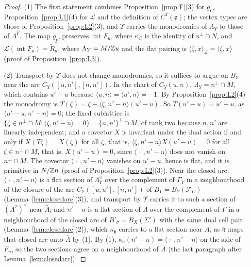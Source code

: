 \begin{proof}
(1) The first statement combines Proposition~\ref{prop:F}(3) for $g_C$, Proposition~\ref{prop:L1}(4) for $\mathcal L$ and
the definition of $C^\Upsilon({\mathfrak p})$; the vertex types are those of Proposition~\ref{prop:L2}(3), and $\Upsilon$ carries the
monodromies of $\Lambda_Y$ to those of $\Lambda^\Upsilon$. The map $g_C$ preserves $\operatorname{int}F_u$, where
$\kappa_C$ is the identity of $u^\perp\cap N$, and $\mathcal L(\operatorname{int}F_u)=\widetilde R^*_u$, where
$\Lambda_Y=M/\mathbb Z u$ and the flat pairing is $\langle\bar\zeta,x\rangle_{\mathcal L}=\langle\zeta,x\rangle$ (proof of Proposition~\ref{prop:L3}).

(2) Transport by $\Upsilon$ does not change monodromies, so it suffices to argue on $B_Y$ near the arc $C_Y([u,u'],[n,n'])$.
In the chart of $C_Y(u,n)$, $\Lambda_Y=n^\perp\cap M$, which contains $u'-u$ because $\langle u,n\rangle=\langle
u',n\rangle=-1$. By Proposition~\ref{prop:L2}(4) the monodromy is $T(\zeta)=\zeta+\langle\zeta,n'-n\rangle(u'-u)$. So
$T(u'-u)=u'-u$, as $\langle u'-u,n'-n\rangle=0$; the fixed sublattice is $\{\zeta\in n^\perp\cap M:\langle
\zeta,n'-n\rangle=0\}=\{n,n'\}^\perp\cap M$, of rank two because $n,n'$ are linearly independent; and a covector $X$ is
invariant under the dual action if and only if $X(T\zeta)=X(\zeta)$ for all $\zeta$, that is, $\langle\zeta,n'-n\rangle X(u'-u)=0$
for all $\zeta\in n^\perp\cap M$, that is, $X(u'-u)=0$, since $\langle\,\cdot\,,n'-n\rangle$ does not vanish on $n^\perp\cap M$.
The covector $\langle\,\cdot\,,n'-n\rangle$ vanishes on $u'-u$, hence is flat, and it is primitive in $N/\mathbb Z n$
(proof of Proposition~\ref{prop:L2}(3)). Near the closed arc: $\langle\,\cdot\,,n'-n\rangle$ is a flat section of
$\Lambda_Y^\vee$ over the complement of $\Gamma_Y$ in a neighbourhood of the closure of the arc $C_Y([u,u'],[n,n'])$ of
$B_Y=B_Y(\mathcal F_C)$ (Lemma~\ref{lem:closedarc}(3)), and transport by $\Upsilon$ carries it to such a section of
$(\Lambda^\Upsilon)^\vee$ near $\bar A$; and $n'-n$ is a flat section of $\Lambda$ over the complement of $\Gamma$ in a
neighbourhood of the closed arc of $B'_\sigma=B_X(\Sigma')$ with the same dual cell pair (Lemma~\ref{lem:closedarc}(2)), which $\kappa_{\mathfrak h}$
carries to a flat section near $\bar A$, as $\mathfrak h$ maps that closed arc onto $\bar A$ by (1). By (1),
$\kappa_{\mathfrak h}(n'-n)=\langle\,\cdot\,,n'-n\rangle$ on the side of $F_u$, so the two sections agree on a neighbourhood of
$\bar A$ (the last paragraph after Lemma~\ref{lem:closedarc}).


\end{proof}
